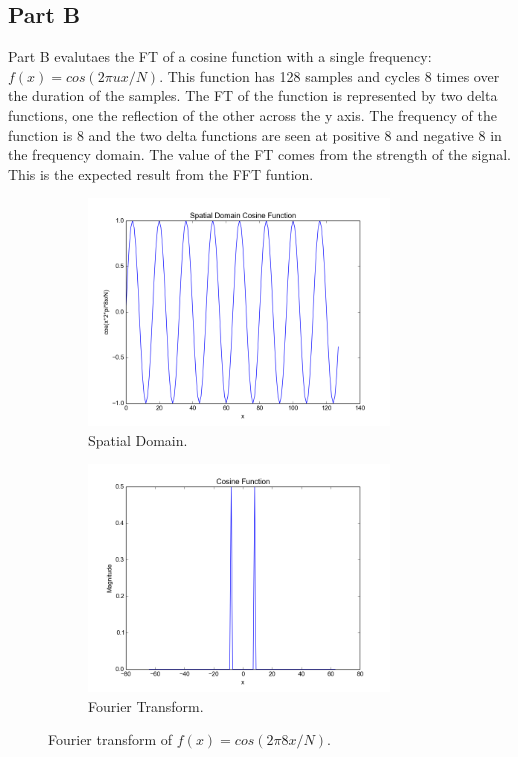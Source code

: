 \documentclass[letter]{article}
\begin{document}
\subsection{Part B}
Part B evalutaes the FT of a cosine function with a single frequency: $f(x) = cos(2 \pi u x / N)$. This function has 128 samples and cycles 8 times over the duration of the samples. The FT of the function is represented by two delta functions, one the reflection of the other across the y axis. The frequency of the function is 8 and the two delta functions are seen at positive 8 and negative 8 in the frequency domain. The value of the FT comes from the strength of the signal. This is the expected result from the FFT funtion.
\begin{figure}[hbtp]
  \centering
  \begin{subfigure}{8cm}
    \includegraphics[width=8cm]{images/cosine_plot_time.png}
    \caption{Spatial Domain.}
  \end{subfigure}
  \begin{subfigure}{8cm}
    \includegraphics[width=8cm]{images/cosine_plot.png}
    \caption{Fourier Transform.}
  \end{subfigure}
  \caption{Fourier transform of $f(x)=cos(2\pi 8x/N)$.}
  \label{fig:ft_cos}
\end{figure}
\end{document}
